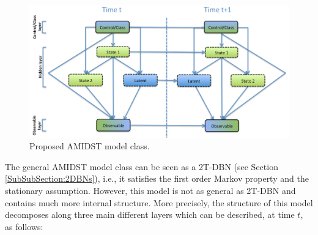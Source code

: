 \begin{figure}[ht!]
\begin{center}
\includegraphics[scale=0.465]{./figures/AMIDSTModelClass}
\caption{\label{Figure:AMIDSTModelClass} Proposed AMIDST model class.}
\end{center}
\end{figure}


The general AMIDST model class can be seen as a 2T-DBN (see Section \ref{SubSubSection:2DBNs}), i.e., it satisfies the first order Markov property and the stationary assumption. However, this model is not as general as 2T-DBN and contains much more internal structure. More precisely, the structure of this model decomposes along three main different layers which can be described, at time $t$, as follows:

